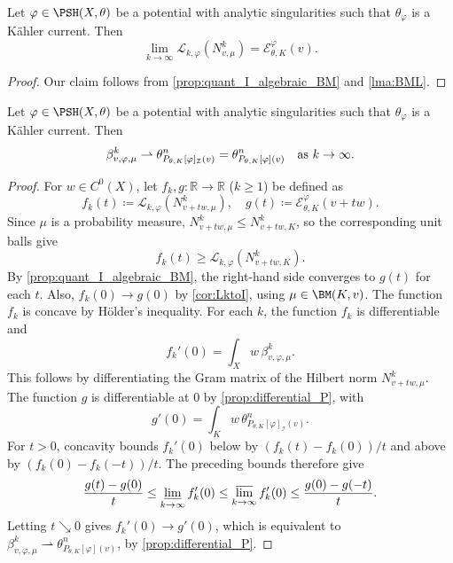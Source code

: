 \begin{corollary} \label{cor:LktoI}
Let $\varphi \in \PSH(X,\theta)$ be a potential with analytic singularities such that $\theta_{\varphi}$ is a Kähler current.
Then
\[
\lim_{k\to\infty}  \mathcal{L}_{k,\varphi}(N^k_{v,\mu})= \mathcal{E}_{\theta,K}^{\varphi}(v).
\]
\end{corollary}
\begin{proof}
Our claim follows from \cref{prop:quant_I_algebraic_BM} and \cref{lma:BML}.
\end{proof}


\begin{proposition}\label{prop:weakconvana}
Let $\varphi \in \PSH(X,\theta)$ be a potential with analytic singularities such that $\theta_{\varphi}$ is a Kähler current. Then
\[
\beta^k_{v,\varphi, \mu} \rightharpoonup \theta_{P_{\theta,K}[\varphi]_{\mathcal{I}}(v)}^n=\theta_{P_{\theta,K}[\varphi](v)}^n\quad \textup{as }k\to\infty.
\]
\end{proposition}

\begin{proof}
For $w\in C^0(X)$, let $f_k,g\colon \mathbb{R}\rightarrow \mathbb{R}$ ($k\geq 1$) be defined as
\[
f_k(t)\coloneqq \mathcal{L}_{k,\varphi}(N^k_{v+tw,\mu}),\quad g(t)\coloneqq \mathcal{E}_{\theta,K}^{\varphi}(v+tw).
\]
Since $\mu$ is a probability measure, $N^k_{v+tw,\mu}\leq N^k_{v+tw,K}$, so the corresponding unit balls give
\[
    f_k(t)\geq \mathcal{L}_{k,\varphi}(N^k_{v+tw,K}).
\]
By \cref{prop:quant_I_algebraic_BM}, the right-hand side converges to $g(t)$ for each $t$. Also, $f_k(0)\to g(0)$ by \cref{cor:LktoI}, using $\mu\in\BM(K,v)$. The function $f_k$ is concave by H\"older's inequality.
For each $k$, the function $f_k$ is differentiable and
\[
    f_k'(0)=\int_X w\,\beta^k_{v,\varphi,\mu}.
\]
This follows by differentiating the Gram matrix of the Hilbert norm $N^k_{v+tw,\mu}$. The function $g$ is differentiable at $0$ by \cref{prop:differential_P}, with
\[
    g'(0)=\int_K w\,\theta^n_{P_{\theta,K}[\varphi]_{\mathcal I}(v)}.
\]
For $t>0$, concavity bounds $f_k'(0)$ below by $(f_k(t)-f_k(0))/t$ and above by $(f_k(0)-f_k(-t))/t$. The preceding bounds therefore give
\[
    \frac{g(t)-g(0)}{t}\leq \varliminf_{k\to\infty} f_k'(0)
    \leq \varlimsup_{k\to\infty} f_k'(0)\leq \frac{g(0)-g(-t)}{t}.
\]
Letting $t\searrow 0$ gives $f_k'(0)\to g'(0)$,
which is equivalent to $\beta^k_{v, \varphi,\mu} \rightharpoonup \theta_{P_{\theta,K}[\varphi](v)}^n$, by \cref{prop:differential_P}.
\end{proof}



